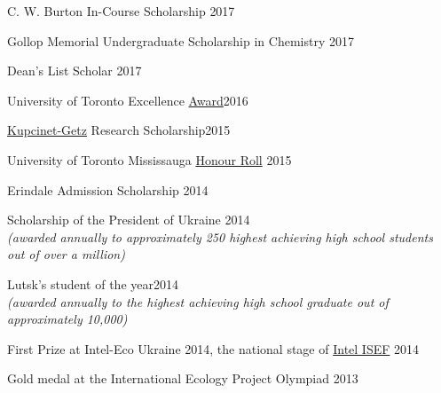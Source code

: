 \documentclass[margin,line]{res}
\begin{document}
\begin{resume}
\vspace*{-2.5mm}

C. W. Burton In-Course Scholarship \hfill{2017} 

\vspace*{-2.5mm}

Gollop Memorial Undergraduate Scholarship in Chemistry \hfill{2017}

\vspace*{-2.5mm}

Dean’s List Scholar \hfill{2017}

\vspace*{-2.5mm}

University of Toronto Excellence \href{https://registrar.utoronto.ca/finances-and-funding/utea/}{Award}\hfill{2016}


\vspace*{-2.5mm}

\href{https://www.weizmann.ac.il/feinberg/admissions/kupcinet-getz-international-summer-school/about-program-0}{Kupcinet-Getz} Research Scholarship\hfill{2015}

\vspace*{-2.5mm}


University of Toronto Mississauga \href{https://www.utm.utoronto.ca/cps/honour-roll/2014-15}{Honour Roll} \hfill{2015}

\vspace*{-2.5mm}

Erindale Admission Scholarship  \hfill{2014} 

\vspace*{-2.5mm}

Scholarship of the President of Ukraine \hfill{2014}\\
{\em(awarded annually to approximately 250 highest achieving high school students out of over a million)}

\vspace*{-2.5mm}

Lutsk's student of the year\hfill{2014}\\
{\em(awarded annually to the highest achieving high school graduate out of approximately 10,000)}
\vspace*{-2.5mm}

First Prize at Intel-Eco Ukraine 2014, the national stage of \href{https://student.societyforscience.org/intel-isef}{Intel ISEF} \hfill{2014}

\vspace*{-2.5mm}

Gold medal at the International Ecology Project Olympiad \hfill{2013}



\end{resume}
\end{document}
